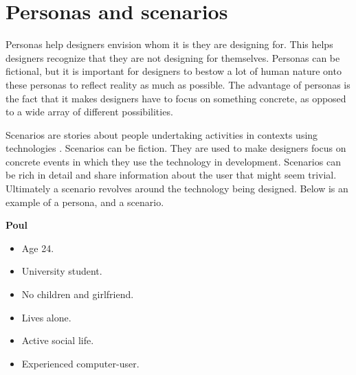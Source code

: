 \section{Personas and scenarios}


Personas help designers envision whom it is they are designing for. This helps designers recognize that they are not designing for themselves. Personas can be fictional, but it is important for designers to bestow a lot of human nature onto these personas to reflect reality as much as possible. The advantage of personas is the fact that it makes designers have to focus on something concrete, as opposed to a wide array of different possibilities\cite{Benyon10}.


Scenarios are stories about people undertaking activities in contexts using technologies \cite{Benyon10}. Scenarios can be fiction. They are used to make designers focus on concrete events in which they use the technology in development. Scenarios can be rich in detail and share information about the user that might seem trivial. Ultimately a scenario revolves around the technology being designed\cite{Benyon10}.
Below is an example of a persona, and a scenario.

\vspace{5 mm}
\noindent

\textbf{Poul}
\begin{itemize}
	\item Age 24.
	\item University student.
	\item No children and girlfriend.
	\item Lives alone.
	\item Active social life.
	\item Experienced computer-user.
\end{itemize}

\vspace{5 mm}

